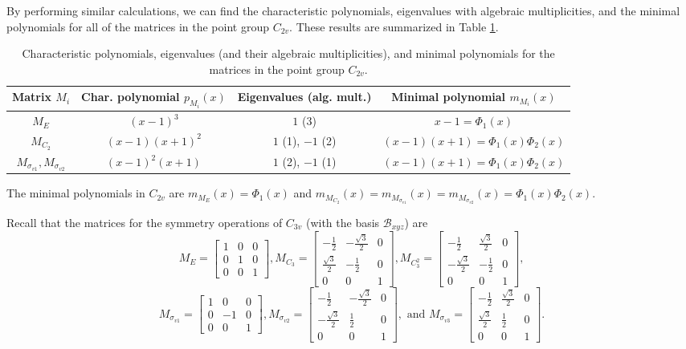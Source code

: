 \documentclass{article}
\begin{document}
    By performing similar calculations, we can find the characteristic polynomials, eigenvalues with algebraic multiplicities, and the minimal polynomials for all of the matrices in the point group $C_{2v}$. These results are summarized in Table \ref{tab:c2vpoly}.

    \begin{table}[p]
        \centering
        \renewcommand{\arraystretch}{3.5}
        \begin{tabular}{cccc}
            Matrix $M_i$ & Char. polynomial $p_{M_i}(x)$ & Eigenvalues (alg. mult.) & Minimal polynomial $m_{M_i}(x)$\\
            \hline
            $M_E$ & $(x-1)^3$ & $1$ (3) & $x-1=\Phi_1(x)$\\[5mm]
            $M_{C_2}$ & $(x-1)(x+1)^2$ & $1$ (1), $-1$ (2) & $(x-1)(x+1)=\Phi_1(x)\Phi_2(x)$\\[5mm]
            $M_{\sigma_{v1}}, M_{\sigma_{v2}}$ & $(x-1)^2(x+1)$ & $1$ (2), $-1$ (1) & $(x-1)(x+1)=\Phi_1(x)\Phi_2(x)$
        \end{tabular}
        \caption{Characteristic polynomials, eigenvalues (and their algebraic multiplicities), and minimal polynomials for the matrices in the point group $C_{2v}$.}
        \label{tab:c2vpoly}
    \end{table}

    The minimal polynomials in $C_{2v}$ are $m_{M_E}(x)=\Phi_1(x)$ and $m_{M_{C_2}}(x)=m_{M_{\sigma_{v1}}}(x)=m_{M_{\sigma_{v2}}}(x)=\Phi_1(x)\Phi_2(x)$.

    Recall that the matrices for the symmetry operations of $C_{3v}$ (with the basis $\mathcal B_{xyz}$) are \[M_E=\begin{bmatrix}1&0&0\\0&1&0\\0&0&1\end{bmatrix}, M_{C_3}=\begin{bmatrix}-\frac12&-\frac{\sqrt{3}}2&0\\\frac{\sqrt{3}}2&-\frac12&0\\0&0&1\end{bmatrix}, M_{C_3^2}=\begin{bmatrix}-\frac12&\frac{\sqrt{3}}2&0\\-\frac{\sqrt{3}}2&-\frac12&0\\0&0&1\end{bmatrix},\]
    \[M_{\sigma_{v1}}=\begin{bmatrix}1&0&0\\0&-1&0\\0&0&1\end{bmatrix}, M_{\sigma_{v2}}=\begin{bmatrix}-\frac12&-\frac{\sqrt{3}}2&0\\-\frac{\sqrt3}2&\frac12&0\\0&0&1\end{bmatrix}, \text{ and } M_{\sigma_{v3}}=\begin{bmatrix}-\frac12&\frac{\sqrt{3}}2&0\\\frac{\sqrt3}2&\frac12&0\\0&0&1\end{bmatrix}.\]
\end{document}
